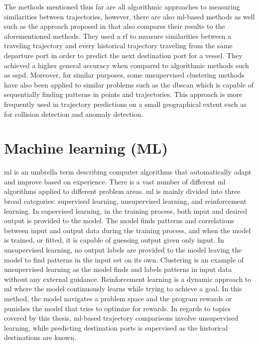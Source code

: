 The methods mentioned thus far are all algorithmic approaches to measuring similarities between trajectories, however, there are also \acrshort{ml}-based methods as well such as the approach proposed in \cite{Zhang2020AISApproach} that also compares their results to the aforementioned methods. They used a \acrfull{rf} to measure similarities between a traveling trajectory and every historical trajectory traveling from the same departure port in order to predict the next destination port for a vessel. They achieved a higher general accuracy when compared to algorithmic methods such as \acrshort{sspd}. Moreover, for similar purposes, some unsupervised clustering methods have also been applied to similar problems such as the \acrfull{dbscan} which is capable of sequentially finding patterns in points and trajectories. This approach is more frequently used in trajectory predictions on a small geographical extent such as for collision detection and anomaly detection.

\section{Machine learning (ML)}

\acrfull{ml} is an umbrella term describing computer algorithms that automatically adapt and improve based on experience. There is a vast number of different \acrshort{ml} algorithms applied to different problem areas. \acrshort{ml} is mainly divided into three broad categories: supervised learning, unsupervised learning, and reinforcement learning. In supervised learning, in the training process, both input and desired output is provided to the model. The model finds patterns and correlations between input and output data during the training process, and when the model is trained, or fitted, it is capable of guessing output given only input. In unsupervised learning, no output labels are provided to the model leaving the model to find patterns in the input set on its own. Clustering is an example of unsupervised learning as the model finds and labels patterns in input data without any external guidance. Reinforcement learning is a dynamic approach to \acrshort{ml} where the model continuously learns while trying to achieve a goal. In this method, the model navigates a problem space and the program rewards or punishes the model that tries to optimize for rewards. In regards to topics covered by this thesis, \acrshort{ml}-based trajectory comparisons involve unsupervised learning, while predicting destination ports is supervised as the historical destinations are known.

